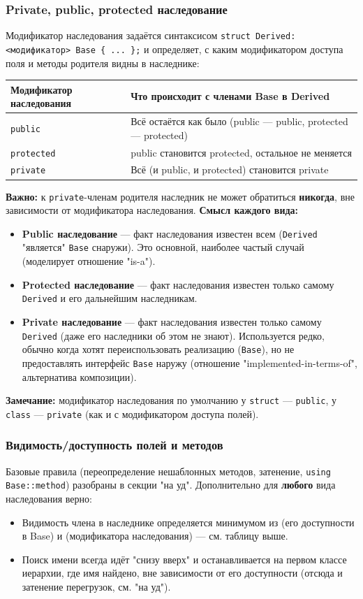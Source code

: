 \subsubsection{Private, public, protected наследование}
Модификатор наследования задаётся синтаксисом \texttt{struct Derived: <модификатор> Base \{ ... \};} и определяет, с каким модификатором доступа поля и методы родителя видны в наследнике:
\begin{center}
\begin{tabular}{|l|l|}
\hline
\textbf{Модификатор наследования} & \textbf{Что происходит с членами Base в Derived} \\
\hline
\texttt{public} & Всё остаётся как было (public --- public, protected --- protected) \\
\texttt{protected} & public становится protected, остальное не меняется \\
\texttt{private} & Всё (и public, и protected) становится private \\
\hline
\end{tabular}
\end{center}
\textbf{Важно:} к \texttt{private}-членам родителя наследник не может обратиться \textbf{никогда}, вне зависимости от модификатора наследования.
\textbf{Смысл каждого вида:}
\begin{itemize}
  \item \textbf{Public наследование} --- факт наследования известен всем (\texttt{Derived} "является" \texttt{Base} снаружи). Это основной, наиболее частый случай (моделирует отношение "is-a").
  \item \textbf{Protected наследование} --- факт наследования известен только самому \texttt{Derived} и его дальнейшим наследникам.
  \item \textbf{Private наследование} --- факт наследования известен только самому \texttt{Derived} (даже его наследники об этом не знают). Используется редко, обычно когда хотят переиспользовать реализацию (\texttt{Base}), но не предоставлять интерфейс \texttt{Base} наружу (отношение "implemented-in-terms-of", альтернатива композиции).
\end{itemize}
\textbf{Замечание:} модификатор наследования по умолчанию у \texttt{struct} --- \texttt{public}, у \texttt{class} --- \texttt{private} (как и с модификатором доступа полей).
\subsubsection{Видимость/доступность полей и методов}
Базовые правила (переопределение нешаблонных методов, затенение, \texttt{using Base::method}) разобраны в секции "на уд". Дополнительно для \textbf{любого} вида наследования верно:
\begin{itemize}
  \item Видимость члена в наследнике определяется минимумом из (его доступности в Base) и (модификатора наследования) --- см. таблицу выше.
  \item Поиск имени всегда идёт "снизу вверх" и останавливается на первом классе иерархии, где имя найдено, вне зависимости от его доступности (отсюда и затенение перегрузок, см. "на уд").
\end{itemize}
